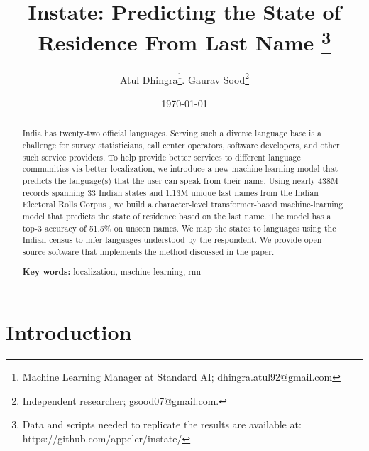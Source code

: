 \documentclass[11pt,  letterpaper]{article}
\title{Instate: Predicting the State of Residence From Last Name
\thanks{Data and scripts needed to replicate the results are available at: https://github.com/appeler/instate/}}
\author{Atul Dhingra\thanks{Machine Learning Manager at Standard AI; \textsf{dhingra.atul92@gmail.com}}.
Gaurav Sood\thanks{Independent researcher;  \textsf{gsood07@gmail.com}.}}
\date{\today}
\begin{document}
\maketitle

\begin{abstract}

India has twenty-two official languages. Serving such a diverse language base is a challenge for survey statisticians, call center operators, software developers, and other such service providers. To help provide better services to different language communities via better localization, we introduce a new machine learning model that predicts the language(s) that the user can speak from their name. Using nearly 438M records spanning 33 Indian states and 1.13M unique last names from the Indian Electoral Rolls Corpus \citep{DVN/OG47IV_2023}, we build a character-level transformer-based machine-learning model that predicts the state of residence based on the last name. The model has a top-3 accuracy of 51.5\% on unseen names. We map the states to languages using the Indian census to infer languages understood by the respondent. We provide open-source software that implements the method discussed in the paper.

\smallskip

\textbf{Key words:} localization, machine learning, rnn

\end{abstract}




\section{Introduction}
\end{document}
